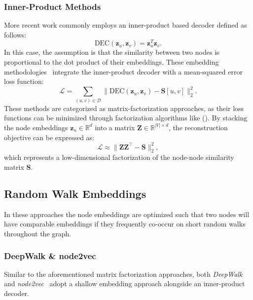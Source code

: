 \subsubsection{Inner-Product Methods}
More recent work commonly employs an inner-product based decoder defined as follows:
\begin{equation}\label{eq:innerProductDec}
    \text{DEC}(\mathbf{z}_u, \mathbf{z}_v) = \mathbf{z}_u^T\mathbf{z}_v.
\end{equation}
In this case, the assumption is that the similarity between two nodes is proportional to the dot product of their embeddings. These embedding methodologies~\cite{Ahmed2013distributedLargeScaleNaturalGraphFactorization}\cite{Cao2015grarep}\cite{Ou2016asymmetricTransitivityPreservingGraphEmbedding} integrate the inner-product decoder with a mean-squared error loss function:
\begin{equation*}
    \mathcal{L} = \sum_{(u,v)\in\mathcal{D}} \|\text{DEC}(\mathbf{z}_u, \mathbf{z}_v) - \textbf{S}[u,v]\|_2^2.
\end{equation*}
These methods are categorized as matrix-factorization approaches, as their loss functions can be minimized through factorization algorithms like  (). By stacking the node embeddings $ \mathbf{z}_u \in \mathbb{R}^d $ into a matrix $ \mathbf{Z} \in \mathbb{R}^{|V|\times d} $, the reconstruction objective can be expressed as:
\begin{equation*}
    \mathcal{L} \approx \|\mathbf{Z}\mathbf{Z}^\top - \textbf{S}\|_2^2,
\end{equation*}
which represents a low-dimensional factorization of the node-node similarity matrix $ \textbf{S} $. 

\subsection{Random Walk Embeddings}
In these approaches the node embeddings are optimized such that two nodes will have comparable embeddings if they frequently co-occur on short random walks throughout the graph.

\subsubsection{DeepWalk \& node2vec}
Similar to the aforementioned matrix factorization approaches, both \textit{DeepWalk}~\cite{Perozzi2014DeepWalk} and \textit{node2vec}~\cite{Grover2016node2vec} adopt a shallow embedding approach alongside an inner-product decoder.

